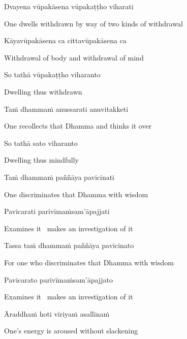 Dvayena vūpakāsena vūpakaṭṭho viharati

\begin{english}
  One dwells withdrawn by way of two kinds of withdrawal
\end{english}

Kāyavūpakāsena ca cittavūpakāsena ca

\begin{english}
  Withdrawal of body and withdrawal of mind
\end{english}

So tathā vūpakaṭṭho viharanto

\begin{english}
  Dwelling thus withdrawn
\end{english}

Taṁ dhammaṁ anussarati anuvitakketi

\begin{english}
  One recollects that Dhamma and thinks it over
\end{english}

So tathā sato viharanto

\begin{english}
  Dwelling thus mindfully
\end{english}

Taṁ dhammaṁ paññāya pavicinati

\begin{english}
  One discriminates that Dhamma with wisdom
\end{english}

Pavicarati parivīmaṁsam'āpajjati

\begin{english}
  Examines it \breathmark\ makes an investigation of it
\end{english}

Tassa taṁ dhammaṁ paññāya pavicinato

\begin{english}
  For one who discriminates that Dhamma with wisdom
\end{english}

Pavicarato parivīmaṁsam'āpajjato

\begin{english}
  Examines it \breathmark\ makes an investigation of it
\end{english}

Āraddhaṁ hoti vīriyaṁ asallīnaṁ

\begin{english}
  One's energy is aroused without slackening
\end{english}

